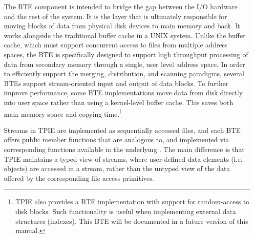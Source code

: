 
The BTE component is intended to bridge the gap between the I/O
hardware and the rest of the system. It is the layer that is
ultimately responsible for moving blocks of data from physical disk
devices to main memory and back. It works alongside the traditional
buffer cache in a UNIX system.  Unlike the buffer
cache, which must support concurrent access to files from multiple
address spaces, the BTE is specifically designed to support high
throughput processing of data from secondary memory through a single,
user level address space. In order to efficiently support the merging,
distribution, and scanning paradigms, several BTEs support
stream-oriented input and output of data blocks. To further improve
performance, some BTE implementations move data from disk directly
into user space rather than using a kernel-level buffer
cache.  This saves both main memory space and
copying time.\footnote{TPIE also provides a BTE implementation with
support for random-access to disk blocks. Such functionality is useful
when implementing external data structures (indexes). This BTE will be
documented in a future version of this manual.}
 

Streams in TPIE are implemented as sequentially accessed files, and
each BTE offers public member functions that are analogous to, and
implemented via corresponding functions available in the underlying
. The main difference is that TPIE maintains
a typed view of streams, where user-defined data elements (i.e.
objects) are accessed in a stream, rather than the untyped view of the
data offered by the corresponding file access primitives.


